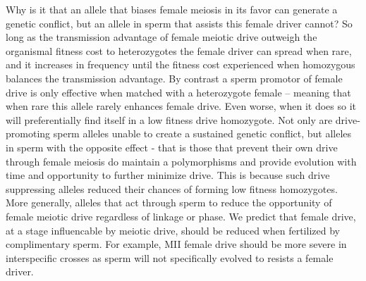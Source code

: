 \documentclass[12pt,letterpaper]{article}
\begin{document}
Why is it that an allele that biases female meiosis in its favor can generate a genetic conflict, but an allele in sperm that assists this female driver cannot? 
So long as the transmission advantage of female meiotic drive outweigh the organismal fitness cost to heterozygotes the female driver can spread when rare, and it increases in 		
	frequency until the fitness cost experienced when homozygous balances the transmission advantage.
By contrast a sperm promotor of female drive is only effective when matched with a heterozygote female -- meaning that when rare this allele rarely enhances female drive. 
Even worse, when it does so it will preferentially find itself in a low fitness drive homozygote. 
Not only are drive-promoting sperm alleles unable to create a sustained genetic conflict, 
	but alleles in sperm with the opposite effect - that is those that prevent their own drive through female meiosis do maintain a polymorphisms and 
	provide evolution  with time and opportunity to further minimize drive.
This is because such drive suppressing alleles reduced their chances
of forming low fitness homozygotes. 
More generally, alleles that act through sperm to
 reduce the opportunity of female meiotic drive regardless of linkage or phase. 
We predict that female drive, at a stage influencable by meiotic
drive,  should be reduced when fertilized by
complimentary sperm. For example, MII female drive should be more severe in
interspecific crosses as sperm will not specifically evolved to
resists a female driver. 

\end{document}

